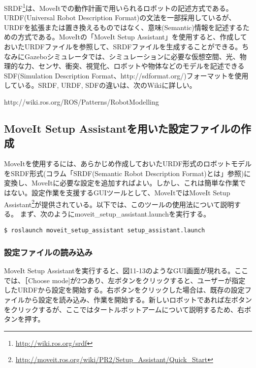 \begin{exercise}
SRDF\footnote{\url{http://wiki.ros.org/srdf}}は、MoveItでの動作計画で用いられるロボットの記述方式である。URDF(Universal Robot Description Format)の文法を一部採用しているが、URDFを拡張または置き換えるものではなく、意味(Semantic)情報を記述するための方式である。MoveItの「MoveIt Setup Assistant」を使用すると、作成しておいたURDFファイルを参照して、SRDFファイルを生成することができる。ちなみにGazeboシミュレータでは、シミュレーションに必要な仮想空間、光、物理的な力、センサ、衝突、視覚化、ロボットや物体などのモデルを記述できるSDF(Simulation Description Format、http://sdformat.org/)フォーマットを使用している。SRDF, URDF, SDFの違いは、次のWikiに詳しい。

http://wiki.ros.org/ROS/Patterns/RobotModelling
\end{exercise}

\subsection{MoveIt Setup Assistantを用いた設定ファイルの作成}

MoveItを使用するには、あらかじめ作成しておいたURDF形式のロボットモデルをSRDF形式(コラム「SRDF(Semantic Robot Description Format)とは」参照)に変換し、MoveItに必要な設定を追加すればよい。しかし、これは簡単な作業ではない。設定作業を支援するGUIツールとして、MoveItではMoveIt Setup Assistant\footnote{\url{http://moveit.ros.org/wiki/PR2/Setup\_Assistant/Quick\_Start}}が提供されている。以下では、このツールの使用法について説明する。
まず、次のようにmoveit\_setup\_assistant.launchを実行する。

\begin{lstlisting}[language=ROS]
$ roslaunch moveit_setup_assistant setup_assistant.launch
\end{lstlisting}

\subsubsection{設定ファイルの読み込み}

MoveIt Setup Assistantを実行すると、図11-13のようなGUI画面が現れる。ここでは、［Choose mode]が2つあり、左ボタンをクリックすると、ユーザーが指定したURDFから設定を開始する。右ボタンをクリックした場合は、既存の設定ファイルから設定を読み込み、作業を開始する。新しいロボットであれば左ボタンをクリックするが、ここではタートルボットアームについて説明するため、右ボタンを押す。

